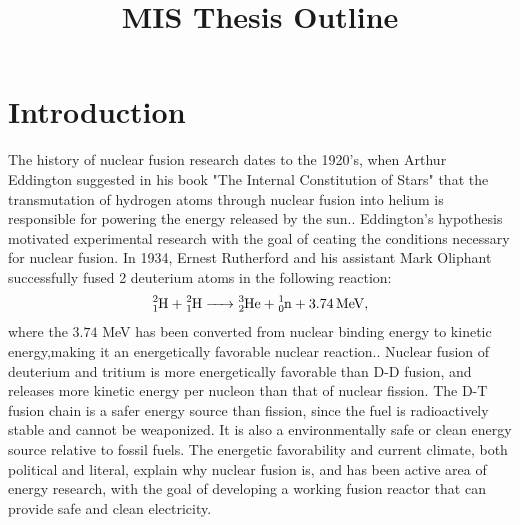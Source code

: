 \documentclass{article}
\title{ MIS Thesis Outline}
\begin{document}
\maketitle
\noindent
\section{Introduction}
The history of nuclear fusion research dates to the 1920's, when Arthur Eddington suggested in his book "The Internal Constitution of Stars" that the transmutation of hydrogen atoms through nuclear fusion into helium is responsible for powering the energy released by the sun.\cite{Eddington}. Eddington's hypothesis motivated experimental research with the goal of ceating the conditions necessary for nuclear fusion.
In 1934, Ernest Rutherford and his assistant Mark Oliphant successfully fused 2 deuterium atoms in the following reaction:
\begin{align*}
\ce{^2_1H + ^2_1H ->	^3_2He + ^1_0n + 3.74 MeV}, 
\end{align*}
where the $3.74$ MeV has been converted from nuclear binding energy to kinetic energy,making it an energetically favorable nuclear reaction.\cite{Oliphant_Rutherford}. %
Nuclear fusion of deuterium and tritium is more energetically favorable than D-D fusion, and releases more kinetic energy per nucleon than that of nuclear fission. The D-T fusion chain is a safer energy source than fission, since the fuel is radioactively stable and cannot be weaponized. It is also a environmentally safe or clean energy source relative to fossil fuels. The energetic favorability and current climate, both political and literal, explain why nuclear fusion is, and has been active area of energy research, with the goal of developing a working fusion reactor that can provide safe and clean electricity.\\

\vspace{0.01cm}
\end{document}
